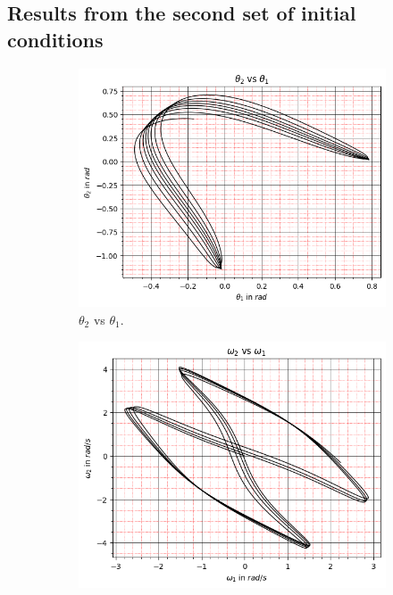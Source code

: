 \subsection{Results from the second set of initial conditions}\label{subsec:results-from-the-second-set-of-initial-conditions}
\begin{figure}[H]
    \centering
    \begin{subfigure}[b]{0.49\textwidth}
        \centering
        \includegraphics[width=\textwidth]{figures/initial-conditions-b/theta_2 vs theta_1.png}
        \caption{$\theta_2$ vs $\theta_1$.}
        \label{fig:3a}
    \end{subfigure}
    \hfill
    \begin{subfigure}[b]{0.49\textwidth}
        \centering
        \includegraphics[width=\textwidth]{figures/initial-conditions-b/omega_2 vs omega_1.png}

\end{subfigure}
\end{figure}
